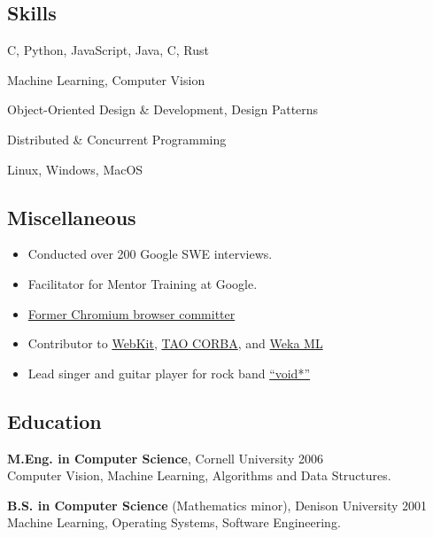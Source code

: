 \documentclass[10pt]{article}
\newcommand{\Rplus}{\protect\hspace{-.1em}\protect\raisebox{.35ex}{\smaller{\smaller\textbf{+}}}}
\newcommand{\Cpp}{\mbox{C\Rplus\Rplus}\xspace}
\begin{document}
\begin{multicols}{2}

\subsection*{Skills}
\begin{itemize}
  \begin{item}
	  \Cpp, Python, JavaScript, Java, C, Rust
  \end{item}
  \begin{item}
	  Machine Learning, Computer Vision
  \end{item}
  \begin{item}
	  Object-Oriented Design \& Development, Design Patterns
  \end{item}
  \begin{item}
	  Distributed \& Concurrent Programming
  \end{item}
  \begin{item}
	  Linux, Windows, MacOS
  \end{item}
\end{itemize}
\columnbreak
\noindent

\subsection*{Miscellaneous}
\begin{itemize}
	\item{Conducted over 200 Google SWE interviews.}
	\item{Facilitator for Mentor Training at Google.}
	\item{\href{https://bugs.chromium.org/u/dmichael@chromium.org/updates}{Former Chromium browser committer}}
	\item{Contributor to \href{https://trac.webkit.org/search?q=dmichael&noquickjump=1&changeset=on&wiki=on}{WebKit}, \href{https://www.dre.vanderbilt.edu/~schmidt/ACE-members.html}{TAO CORBA}, and \href{https://weka.sourceforge.io/doc.packages/ensembleLibrary/weka/classifiers/meta/EnsembleSelection.html}{Weka ML}}
  \item{Lead singer and guitar player for rock band \href{http://voidstarband.com}{``void*''}}
\end{itemize}

\end{multicols}

\subsection*{Education}
\begin{itemize}
\begin{item}
  \textbf{M.Eng. in Computer Science}, Cornell University 2006
	\\
	Computer Vision, Machine Learning, Algorithms and Data Structures.
\end{item}
\begin{item}
  \textbf{B.S. in Computer Science} (Mathematics minor), Denison University 2001\\
	Machine Learning, Operating Systems, Software Engineering.
\end{item}  
\end{itemize}
\end{document}
